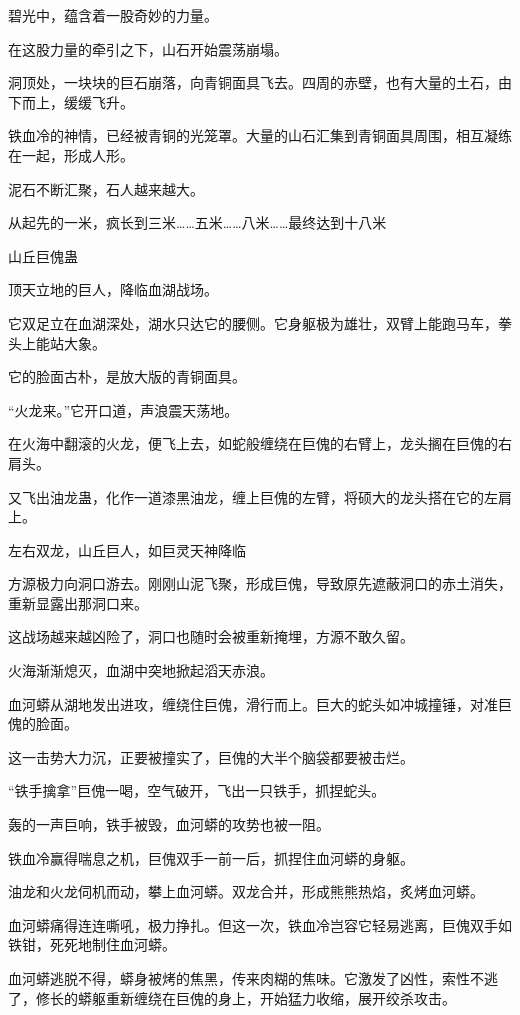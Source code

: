 \begin{this_body}
碧光中，蕴含着一股奇妙的力量。

在这股力量的牵引之下，山石开始震荡崩塌。

洞顶处，一块块的巨石崩落，向青铜面具飞去。四周的赤壁，也有大量的土石，由下而上，缓缓飞升。

铁血冷的神情，已经被青铜的光笼罩。大量的山石汇集到青铜面具周围，相互凝练在一起，形成人形。

泥石不断汇聚，石人越来越大。

从起先的一米，疯长到三米……五米……八米……最终达到十八米

山丘巨傀蛊

顶天立地的巨人，降临血湖战场。

它双足立在血湖深处，湖水只达它的腰侧。它身躯极为雄壮，双臂上能跑马车，拳头上能站大象。

它的脸面古朴，是放大版的青铜面具。

“火龙来。”它开口道，声浪震天荡地。

在火海中翻滚的火龙，便飞上去，如蛇般缠绕在巨傀的右臂上，龙头搁在巨傀的右肩头。

又飞出油龙蛊，化作一道漆黑油龙，缠上巨傀的左臂，将硕大的龙头搭在它的左肩上。

左右双龙，山丘巨人，如巨灵天神降临

方源极力向洞口游去。刚刚山泥飞聚，形成巨傀，导致原先遮蔽洞口的赤土消失，重新显露出那洞口来。

这战场越来越凶险了，洞口也随时会被重新掩埋，方源不敢久留。

火海渐渐熄灭，血湖中突地掀起滔天赤浪。

血河蟒从湖地发出进攻，缠绕住巨傀，滑行而上。巨大的蛇头如冲城撞锤，对准巨傀的脸面。

这一击势大力沉，正要被撞实了，巨傀的大半个脑袋都要被击烂。

“铁手擒拿”巨傀一喝，空气破开，飞出一只铁手，抓捏蛇头。

轰的一声巨响，铁手被毁，血河蟒的攻势也被一阻。

铁血冷赢得喘息之机，巨傀双手一前一后，抓捏住血河蟒的身躯。

油龙和火龙伺机而动，攀上血河蟒。双龙合并，形成熊熊热焰，炙烤血河蟒。

血河蟒痛得连连嘶吼，极力挣扎。但这一次，铁血冷岂容它轻易逃离，巨傀双手如铁钳，死死地制住血河蟒。

血河蟒逃脱不得，蟒身被烤的焦黑，传来肉糊的焦味。它激发了凶性，索性不逃了，修长的蟒躯重新缠绕在巨傀的身上，开始猛力收缩，展开绞杀攻击。


\end{this_body}

